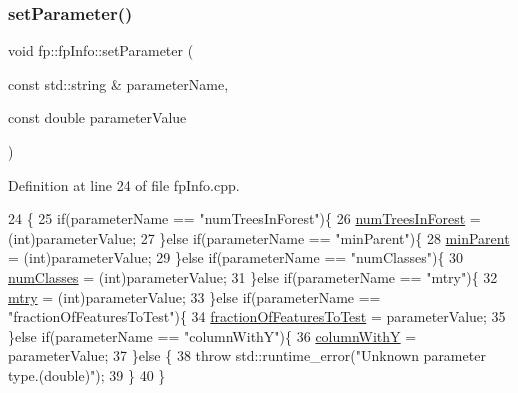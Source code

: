 \subsubsection{\texorpdfstring{set\+Parameter()}{setParameter()}\hspace{0.1cm}{\footnotesize\ttfamily [2/3]}}
{\footnotesize\ttfamily void fp\+::fp\+Info\+::set\+Parameter (\begin{DoxyParamCaption}\item[{const std\+::string \&}]{parameter\+Name,  }\item[{const double}]{parameter\+Value }\end{DoxyParamCaption})}



Definition at line 24 of file fp\+Info.\+cpp.


\begin{DoxyCode}
24                                                                                         \{
25         \textcolor{keywordflow}{if}(parameterName == \textcolor{stringliteral}{"numTreesInForest"})\{
26             \hyperlink{classfp_1_1fpInfo_a8dbd62dca5c972c29d29a69d90ca2632}{numTreesInForest} = (int)parameterValue;
27         \}\textcolor{keywordflow}{else} \textcolor{keywordflow}{if}(parameterName == \textcolor{stringliteral}{"minParent"})\{
28             \hyperlink{classfp_1_1fpInfo_a128fab7ba6da0fc76da00b48bb1bd7d5}{minParent} = (int)parameterValue;
29         \}\textcolor{keywordflow}{else} \textcolor{keywordflow}{if}(parameterName == \textcolor{stringliteral}{"numClasses"})\{
30             \hyperlink{classfp_1_1fpInfo_a1c98a9ced12230f21003f78d742625a3}{numClasses} = (int)parameterValue;
31         \}\textcolor{keywordflow}{else} \textcolor{keywordflow}{if}(parameterName == \textcolor{stringliteral}{"mtry"})\{
32             \hyperlink{classfp_1_1fpInfo_a62cccc1eb5641ebec2a6cc86cf03eedf}{mtry} = (int)parameterValue;
33         \}\textcolor{keywordflow}{else} \textcolor{keywordflow}{if}(parameterName == \textcolor{stringliteral}{"fractionOfFeaturesToTest"})\{
34             \hyperlink{classfp_1_1fpInfo_ab949cb97523283367e9b120fd78e3c3b}{fractionOfFeaturesToTest} = parameterValue;
35         \}\textcolor{keywordflow}{else} \textcolor{keywordflow}{if}(parameterName == \textcolor{stringliteral}{"columnWithY"})\{
36             \hyperlink{classfp_1_1fpInfo_ac29e135cd84cdef547b678e7ea37f92d}{columnWithY} = parameterValue;
37         \}\textcolor{keywordflow}{else} \{
38             \textcolor{keywordflow}{throw} std::runtime\_error(\textcolor{stringliteral}{"Unknown parameter type.(double)"});
39         \}
40     \}
\end{DoxyCode}
\mbox{\label{classfp_1_1fpInfo_aa2dd574c5a3764c250f1ccb1b11de1e0}} 
